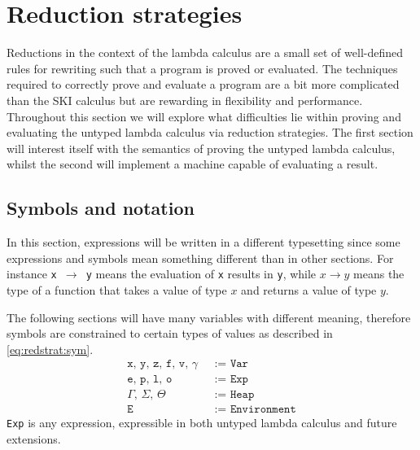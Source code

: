 \section{Reduction strategies}
Reductions in the context of the lambda calculus are a small set of well-defined rules for rewriting such that a program is proved or evaluated.
The techniques required to correctly prove and evaluate a program are a bit more complicated than the SKI calculus but are rewarding in flexibility and performance.
Throughout this section we will explore what difficulties lie within proving and evaluating the untyped lambda calculus via reduction strategies.
The first section will interest itself with the semantics of proving the untyped lambda calculus, whilst the second will implement a machine capable of evaluating a result.

\subsection{Symbols and notation}
In this section, expressions will be written in a different typesetting since some expressions and symbols mean something different than in other sections.
For instance \texttt{x $\rightarrow$ y} means the evaluation of \texttt{x} results in \texttt{y}, while $x \rightarrow y$ means the type of a function that takes a value of type $x$ and returns a value of type $y$.

The following sections will have many variables with different meaning, therefore symbols are constrained to certain types of values as described in \autoref{eq:redstrat:sym}.
\begin{align}
	\texttt{x, y, z, f, v, $\gamma$ }      & \texttt{:= Var}\label{eq:redstrat:sym} \\
	\texttt{e, p, l, o }                   & \texttt{:= Exp}\tag*{}                 \\
	\texttt{$\Gamma$, $\Sigma$, $\Theta$ } & \texttt{:= Heap}\tag*{}                \\
	\texttt{E }                            & \texttt{:= Environment}\tag*{}
\end{align}
\texttt{Exp} is any expression, expressible in both untyped lambda calculus and future extensions.


